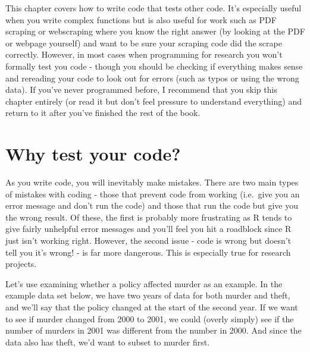 \documentclass[
]{krantz}
\begin{document}
This chapter covers how to write code that tests other code. It's especially useful when you write complex functions but is also useful for work such as PDF scraping or webscraping where you know the right answer (by looking at the PDF or webpage yourself) and want to be sure your scraping code did the scrape correctly. However, in most cases when programming for research you won't formally test you code - though you should be checking if everything makes sense and rereading your code to look out for errors (such as typos or using the wrong data). If you've never programmed before, I recommend that you skip this chapter entirely (or read it but don't feel pressure to understand everything) and return to it after you've finished the rest of the book.

\hypertarget{why-test-your-code}{%
\section{Why test your code?}\label{why-test-your-code}}

As you write code, you will inevitably make mistakes. There are two main types of mistakes with coding - those that prevent code from working (i.e.~give you an error message and don't run the code) and those that run the code but give you the wrong result. Of these, the first is probably more frustrating as R tends to give fairly unhelpful error messages and you'll feel you hit a roadblock since R just isn't working right. However, the second issue - code is wrong but doesn't tell you it's wrong! - is far more dangerous. This is especially true for research projects.

Let's use examining whether a policy affected murder as an example. In the example data set below, we have two years of data for both murder and theft, and we'll say that the policy changed at the start of the second year. If we want to see if murder changed from 2000 to 2001, we could (overly simply) see if the number of murders in 2001 was different from the number in 2000. And since the data also has theft, we'd want to subset to murder first.
\end{document}
